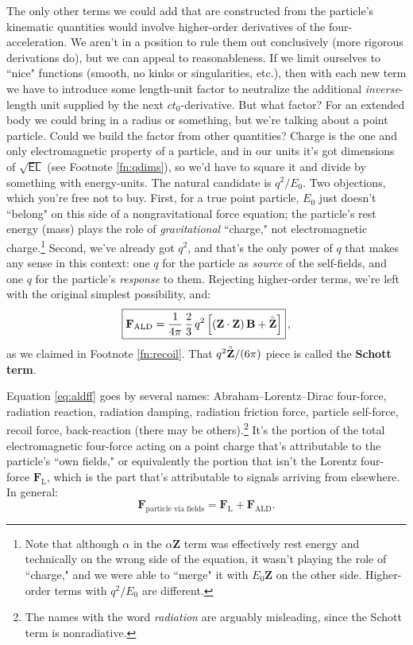 \documentclass[12pt]{article}
\renewcommand{\mathring}[1]{\accentset{\circ}{#1}}
\renewcommand{\vv}[1]{\mathbf{#1}}
\begin{document}
The only other terms we could add that are constructed from the particle's kinematic quantities would involve higher-order derivatives of the four-acceleration. We aren't in a position to rule them out conclusively (more rigorous derivations do), but we can appeal to reasonableness. If we limit ourselves to ``nice" functions (smooth, no kinks or singularities, etc.), then with each new term we have to introduce some length-unit factor to neutralize the additional \emph{inverse}-length unit supplied by the next $c t_0$-derivative. But what factor? For an extended body we could bring in a radius or something, but we're talking about a point particle. Could we build the factor from other quantities? Charge is the one and only electromagnetic property of a particle, and in our units it's got dimensions of $\sqrt{\mathsf{E}\mathsf{L}}$ (see Footnote \ref{fn:qdims}), so we'd have to square it and divide by something with energy-units. The natural candidate is $q^2 / E_0$. Two objections, which you're free not to buy. First, for a true point particle, $E_0$ just doesn't ``belong" on this side of a nongravitational force equation; the particle's rest energy (mass) plays the role of \emph{gravitational} ``charge," not electromagnetic charge.\footnote{Note that although $\alpha$ in the $\alpha \vv Z$ term was effectively rest energy and technically on the wrong side of the equation, it wasn't playing the role of ``charge," and we were able to ``merge" it with $E_0 \vv Z$ on the other side. Higher-order terms with $q^2 / E_0$ are different.} Second, we've already got $q^2$, and that's the only power of $q$ that makes any sense in this context: one $q$ for the particle as \emph{source} of the self-fields, and one $q$ for the particle's \emph{response} to them. Rejecting higher-order terms, we're left with the original simplest possibility, and:
\begin{equation}\label{eq:aldff}
\boxed{ \vv F_{\textrm{ALD}} = \dfrac{1}{4 \pi} \, \dfrac{2}{3} \, q^2 \left[ \left( \vv Z \cdot \vv Z \right) \vv B + \mathring{\vv Z} \right] } \, ,
\end{equation}
as we claimed in Footnote \ref{fn:recoil}. That $q^2 \mathring{\vv Z} / (6 \pi)$ piece is called the \textbf{Schott term}.

Equation \ref{eq:aldff} goes by several names: Abraham--Lorentz--Dirac four-force, radiation reaction, radiation damping, radiation friction force, particle self-force, recoil force, back-reaction (there may be others).\footnote{The names with the word \emph{radiation} are arguably misleading, since the Schott term is nonradiative.} It's the portion of the total electromagnetic four-force acting on a point charge that's attributable to the particle's ``own fields," or equivalently the portion that isn't the Lorentz four-force $\vv F_{\textrm{L}}$, which is the part that's attributable to signals arriving from elsewhere. In general:
\begin{equation*}
\vv F_{\textrm{particle via fields}} =  \vv F_{\textrm{L}} + \vv F_{\textrm{ALD}} .
\end{equation*}
\end{document}
